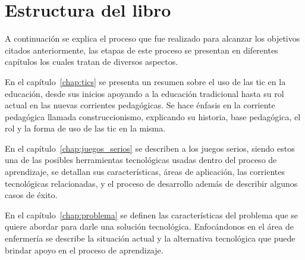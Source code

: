 \section{Estructura del libro}
    

A continuación se explica el proceso que fue realizado para alcanzar los objetivos citados 
anteriormente, las etapas de este proceso se presentan en diferentes capítulos los cuales 
tratan de diversos aspectos.


En el capítulo~\ref{chap:tics} se presenta un resumen sobre el uso de las 
\Gls{tic} en la educación, desde sus inicios apoyando a la educación tradicional 
hasta su rol actual en las nuevas corrientes pedagógicas. Se hace énfasis en la 
corriente pedagógica llamada construccionismo, explicando su historia, base 
pedagógica, el rol y la forma de uso de las \Gls{tic} en la misma.



En el capítulo~\ref{chap:juegos_serios} se describen a los juegos serios, siendo 
estos una de las posibles herramientas tecnológicas usadas dentro del proceso de aprendizaje, 
se detallan sus características, áreas de aplicación, las corrientes tecnológicas relacionadas, 
y el proceso de desarrollo además de describir algunos casos de éxito.



En el capítulo~\ref{chap:problema} se definen las características del problema
que se quiere abordar para darle una solución tecnológica. Enfocándonos en el
área de enfermería se describe la situación actual y la alternativa tecnológica 
que puede brindar apoyo en el proceso de aprendizaje.




